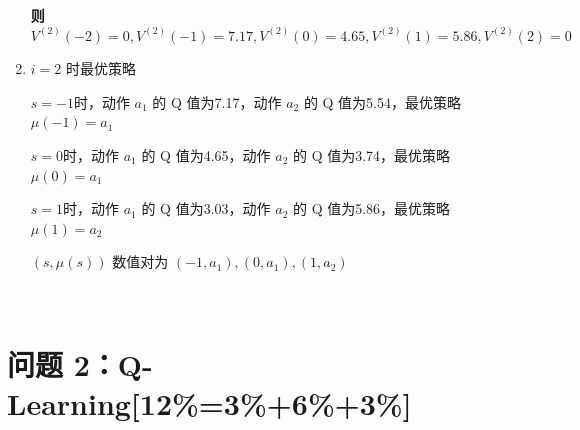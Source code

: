 \documentclass{article}
\begin{document}
\begin{enumerate}[label=(\alph*), start=1]
    \textbf{则}$V^{(2)}(-2) = 0,
    V^{(2)}(-1) = 7.17,
    V^{(2)}(0) = 4.65,
    V^{(2)}(1) = 5.86,
    V^{(2)}(2) = 0$
    
    \item $i=2$ 时最优策略
    
    $s=-1$时，动作 $a_1$ 的 Q 值为7.17，动作  $a_2$ 的 Q 值为5.54，最优策略$\mu(-1)=a_1$
    
    $s=0$时，动作 $a_1$ 的 Q 值为4.65，动作  $a_2$ 的 Q 值为3.74，最优策略$\mu(0)=a_1$
    
    $s=1$时，动作 $a_1$ 的 Q 值为3.03，动作  $a_2$ 的 Q 值为5.86，最优策略$\mu(1)=a_2$
    
    $(s,\mu(s))$ 数值对为 $(-1,a_1),(0,a_1),(1,a_2)$
 
\end{enumerate}
\

\section{问题 2：Q-Learning[12\%=3\%+6\%+3\%]}
\end{document}
